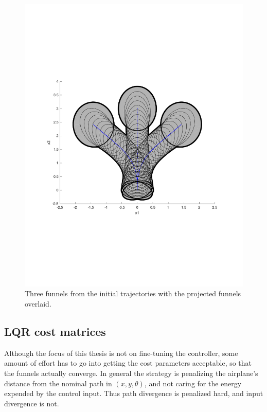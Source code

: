 \begin{figure}
  \centering
  \includegraphics[scale=.5]{figures/experiments/sample-funnel-overlay}
  \caption{Three funnels from the initial trajectories with the projected
    funnels overlaid.}
  \label{fig:sample-funnel-overlay}
\end{figure}

\subsection{LQR cost matrices}
\label{subsec:lqr-cost}

Although the focus of this thesis is not on fine-tuning the controller, some
amount of effort has to go into getting the cost parameters acceptable, so that
the funnels actually converge. In general the strategy is penalizing the
airplane's distance from the nominal path in \((x,y,\theta)\), and not caring for
the energy expended by the control input. Thus path divergence is penalized
hard, and input divergence is not.

